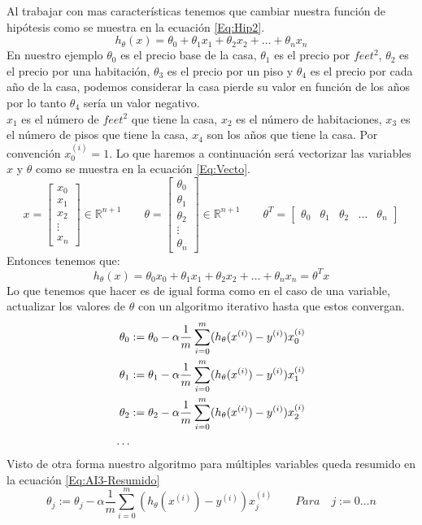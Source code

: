 \documentclass{book}
\begin{document}
Al trabajar con mas características tenemos que cambiar nuestra función de hipótesis como se muestra en la ecuación \ref{Eq:Hip2}.
\begin{equation}
	h_\theta(x)=\theta_0+\theta_1x_1+\theta_2x_2+\dots+\theta_nx_n
	\label{Eq:Hip2}
\end{equation}
En nuestro ejemplo $\theta_0$ es el precio base de la casa, $\theta_1$ es el precio por $feet^2$, $\theta_2$ es el precio por una habitación, $\theta_3$ es el precio por un piso y $\theta_4$ es el precio por cada año de la casa, podemos considerar la casa pierde su valor en función de los años por lo tanto $\theta_4$ sería un valor negativo.\\
$x_1$ es el número de $feet^2$ que tiene la casa, $x_2$ es el número de habitaciones, $x_3$ es el número de pisos que tiene la casa, $x_4$ son los años que tiene la casa. Por convención $x_0^{(i)}=1$. Lo que haremos a continuación será vectorizar las variables $x$ y $\theta$ como se muestra en la ecuación \ref{Eq:Vecto}.
\begin{equation}
x=\left[
\begin{array}{c}
	x_0\\x_1\\x_2\\\vdots\\x_n
\end{array}
\right]\in \mathbb{R}^{n+1}\qquad
\theta=\left[
\begin{array}{c}
\theta_0\\\theta_1\\\theta_2\\\vdots\\\theta_n
\end{array}
\right]\in \mathbb{R}^{n+1}\qquad
\theta^T=\left[
\begin{array}{ccccc}
\theta_0&\theta_1&\theta_2&\dots&\theta_n
\end{array}
\right]
\label{Eq:Vecto}
\end{equation}
Entonces tenemos que:
\begin{equation}
h_\theta(x)=\theta_0x_0+\theta_1x_1+\theta_2x_2+\dots+\theta_nx_n=\theta^Tx
\label{Eq:HipVecto}
\end{equation}
Lo que tenemos que hacer es de igual forma como en el caso de una variable, actualizar los valores de $\theta$ con un algoritmo iterativo hasta que estos convergan.
\begin{align}
\theta_0&:=\theta_0-\alpha\frac{1}{m}\sum_{i=0}^{m}(h_\theta(x^{(i)})-y^{(i)})x_0^{(i)}\label{Eq:AI3-1}\\
\theta_1&:=\theta_1-\alpha\frac{1}{m}\sum_{i=0}^{m}(h_\theta(x^{(i)})-y^{(i)})x_1^{(i)}\label{Eq:AI3-2}\\
\theta_2&:=\theta_2-\alpha\frac{1}{m}\sum_{i=0}^{m}(h_\theta(x^{(i)})-y^{(i)})x_2^{(i)}\label{Eq:AI3-3}\\
\dots\notag
\end{align}
Visto de otra forma nuestro algoritmo para múltiples variables queda resumido en la ecuación \ref{Eq:AI3-Resumido}
\begin{equation}
\theta_j:=\theta_j-\alpha\frac{1}{m}\sum_{i=0}^{m}(h_\theta(x^{(i)})-y^{(i)})x_j^{(i)} \qquad Para\quad j:=0\dots n
\label{Eq:AI3-Resumido}
\end{equation}
\end{document}
